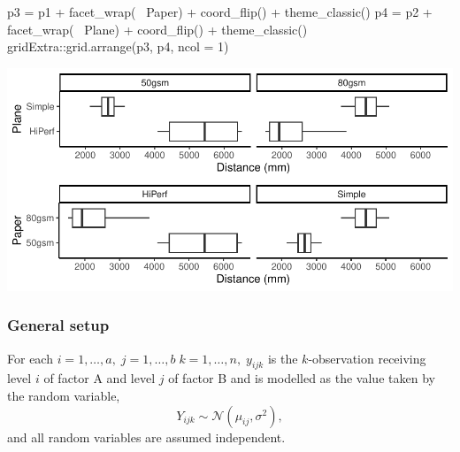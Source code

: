 \documentclass[a4paper]{article}\usepackage[]{graphicx}\usepackage[]{xcolor}
\makeatletter
\def\maxwidth{ %
  \ifdim\Gin@nat@width>\linewidth
    \linewidth
  \else
    \Gin@nat@width
  \fi
}
\makeatother
\begin{document}
\begin{Schunk}
{}

\begin{Sinput}
p3 = p1 + facet_wrap(~ Paper) + coord_flip() + theme_classic()
p4 = p2 + facet_wrap(~ Plane) + coord_flip() + theme_classic()
gridExtra::grid.arrange(p3, p4, ncol = 1)
\end{Sinput}


{\centering \includegraphics[width=\maxwidth]{figure/listings-unnamed-chunk-305-2} 

}

\end{Schunk}
\subsubsection{General setup}
For each \( i = 1,\dotsc,a,\;j = 1,\dotsc,b\;k=1,\dotsc,n,\; y_{ijk} \) is the \( k \)-observation receiving level \( i \) of factor A and level \( j \) of factor B and is modelled as the value taken by the random variable,
\[
	Y_{ijk}\sim \mathcal{N}(\mu_{ij},\sigma^2),
\]
and all random variables are assumed independent.
\end{document}
